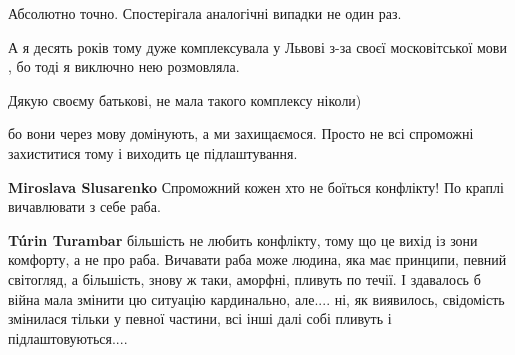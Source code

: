 \begin{itemize}
Абсолютно точно. Спостерігала аналогічні випадки не один раз.

 

А я десять років тому дуже комплексувала у Львові з-за своєї московітської мови
, бо тоді я виключно нею розмовляла.

 
Дякую своєму батькові, не мала такого комплексу ніколи)

 

бо вони через мову домінують, а ми захищаємося. Просто не всі спроможні
захиститися тому і виходить це підлаштування.

\begin{itemize}
 
\textbf{Miroslava Slusarenko}
Спроможний кожен хто не боїться конфлікту!
По краплі вичавлювати з себе раба.

 
\textbf{Túrin Turambar} більшість не любить конфлікту, тому що це вихід із зони комфорту, а не про раба. Вичавати раба може людина, яка має принципи, певний світогляд, а більшість, знову ж таки, аморфні, пливуть по течії. І здавалось б війна мала змінити цю ситуацію кардинально, але.... ні, як виявилось, свідомість змінилася тільки у певної частини, всі інші далі собі пливуть і підлаштовуються....
\end{itemize}


\end{itemize}
